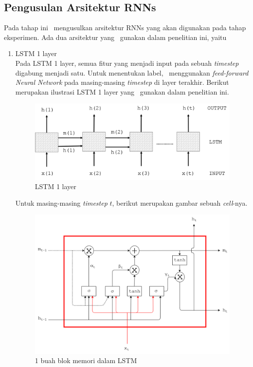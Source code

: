 \subsection{Pengusulan Arsitektur RNNs}
Pada tahap ini \saya~mengusulkan arsitektur RNNs yang akan digunakan pada tahap eksperimen. Ada dua arsitektur yang \saya~gunakan dalam penelitian ini, yaitu
\begin{enumerate}
	\item LSTM 1 layer\\
	Pada LSTM 1 layer, semua fitur yang menjadi input pada sebuah \textit{timestep} digabung menjadi satu. Untuk menentukan label, \saya~menggunakan \textit{feed-forward Neural Network} pada masing-masing \textit{timestep} di layer terakhir. Berikut merupakan ilustrasi LSTM 1 layer yang \saya~gunakan dalam penelitian ini.
	
	\begin{figure}
		\centering
		\includegraphics[width=0.8\linewidth]{images/lstm1}
		\caption{LSTM 1 layer}
		\label{fig:single_layer_rnn}
	\end{figure}
	Untuk masing-masing \textit{timestep} $ t $, berikut merupakan gambar sebuah \textit{cell}-nya.
	\begin{figure}
		\centering
		\includegraphics[width=0.85\linewidth]{images/lstm}
		\caption{1 buah blok memori dalam LSTM}
		\label{fig:lstm1cell}
	\end{figure}
	

\end{enumerate}
